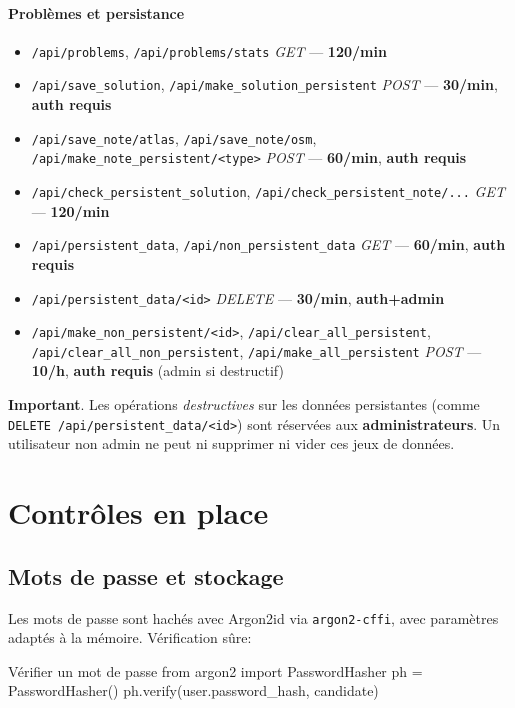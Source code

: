 \paragraph{Problèmes et persistance}
\begin{itemize}
  \item \texttt{/api/problems}, \texttt{/api/problems/stats} \textit{GET} — \textbf{120/min}
  \item \texttt{/api/save\_solution}, \texttt{/api/make\_solution\_persistent} \textit{POST} — \textbf{30/min}, \textbf{auth requis}
  \item \texttt{/api/save\_note/atlas}, \texttt{/api/save\_note/osm}, \texttt{/api/make\_note\_persistent/<type>} \textit{POST} — \textbf{60/min}, \textbf{auth requis}
  \item \texttt{/api/check\_persistent\_solution}, \texttt{/api/check\_persistent\_note/...} \textit{GET} — \textbf{120/min}
  \item \texttt{/api/persistent\_data}, \texttt{/api/non\_persistent\_data} \textit{GET} — \textbf{60/min}, \textbf{auth requis}
  \item \texttt{/api/persistent\_data/<id>} \textit{DELETE} — \textbf{30/min}, \textbf{auth+admin}
  \item \texttt{/api/make\_non\_persistent/<id>}, \texttt{/api/clear\_all\_persistent}, \texttt{/api/clear\_all\_non\_persistent}, \texttt{/api/make\_all\_persistent} \textit{POST} — \textbf{10/h}, \textbf{auth requis} (admin si destructif)
\end{itemize}

\noindent \textbf{Important}. Les opérations \emph{destructives} sur les données persistantes (comme \texttt{DELETE /api/persistent\_data/<id>}) sont réservées aux \textbf{administrateurs}. Un utilisateur non admin ne peut ni supprimer ni vider ces jeux de données.

\section{Contrôles en place}

\subsection*{Mots de passe et stockage}
\noindent Les mots de passe sont hachés avec Argon2id via \texttt{argon2-cffi}, avec paramètres adaptés à la mémoire. Vérification sûre:
\begin{codebox}[language=Python]{Vérifier un mot de passe}
from argon2 import PasswordHasher
ph = PasswordHasher()
ph.verify(user.password_hash, candidate)
\end{codebox}

